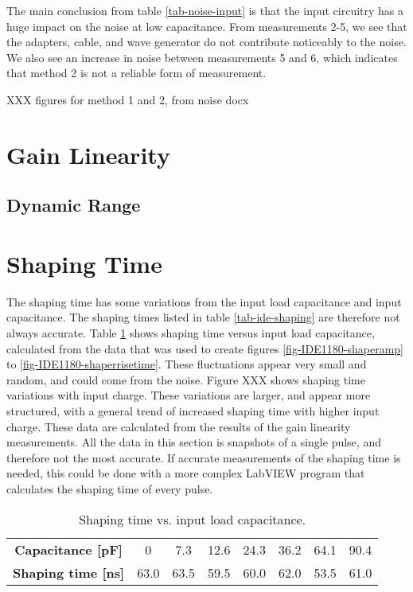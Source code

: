 \documentclass[../main/thesis.tex]{subfiles}
\begin{document}
The main conclusion from table \ref{tab-noise-input} is that the input circuitry has a huge impact on the noise at low capacitance. From measurements 2-5, we see that the adapters, cable, and wave generator do not contribute noticeably to the noise. We also see an increase in noise between measurements 5 and 6, which indicates that method 2 is not a reliable form of measurement. 

XXX figures for method 1 and 2, from noise docx



\section{Gain Linearity}
\label{ide-linearity}


\subsection{Dynamic Range}
\label{ide-dynamicrange}



\section{Shaping Time}
\label{ide-shapingtime}

The shaping time has some variations from the input load capacitance and input capacitance. The shaping times listed in table \ref{tab-ide-shaping} are therefore not always accurate. Table \ref{tab-ide-shaping-c} shows shaping time versus input load capacitance, calculated from the data that was used to create figures \ref{fig-IDE1180-shaperamp} to \ref{fig-IDE1180-shaperrisetime}. These fluctuations appear very small and random, and could come from the noise. Figure XXX shows shaping time variations with input charge. These variations are larger, and appear more structured, with a general trend of increased shaping time with higher input charge. These data are calculated from the results of the gain linearity measurements. All the data in this section is snapshots of a single pulse, and therefore not the most accurate. If accurate measurements of the shaping time is needed, this could be done with a more complex LabVIEW program that calculates the shaping time of every pulse. 

\begin{table}[h!]
	\begin{center}
		\caption{Shaping time vs. input load capacitance.}
		\label{tab-ide-shaping-c}
		\begin{tabular}{cccccccc}\toprule
			\textbf{Capacitance [pF]}      & 0    & 7.3    & 12.6    & 24.3    & 36.2    & 64.1 & 90.4   \\ 
			\textbf{Shaping time [ns]} & 63.0 & 63.5 & 59.5 & 60.0 & 62.0 & 53.5 & 61.0   \\ \bottomrule
		\end{tabular}
	\end{center}
\end{table}
\end{document}
